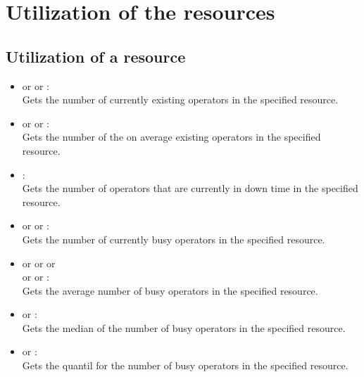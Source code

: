 \section{Utilization of the resources}



\subsection{Utilization of a resource}

\begin{itemize}

\item
{} or  or :\\
Gets the number of currently existing operators in the specified resource.

\item
{} or  or :\\
Gets the number of the on average existing operators in the specified resource.

\item
{}:\\
Gets the number of operators that are currently in down time in the specified resource.

\item
{} or  or :\\
Gets the number of currently busy operators in the specified resource.

\item
{} or  or  or\\
 or  or :\\
Gets the average number of busy operators in the specified resource.

\item
{} or :\\
Gets the median of the number of busy operators in the specified resource.
  
\item
{} or :\\
Gets the quantil for the number of busy operators in the specified resource.


\end{itemize}
